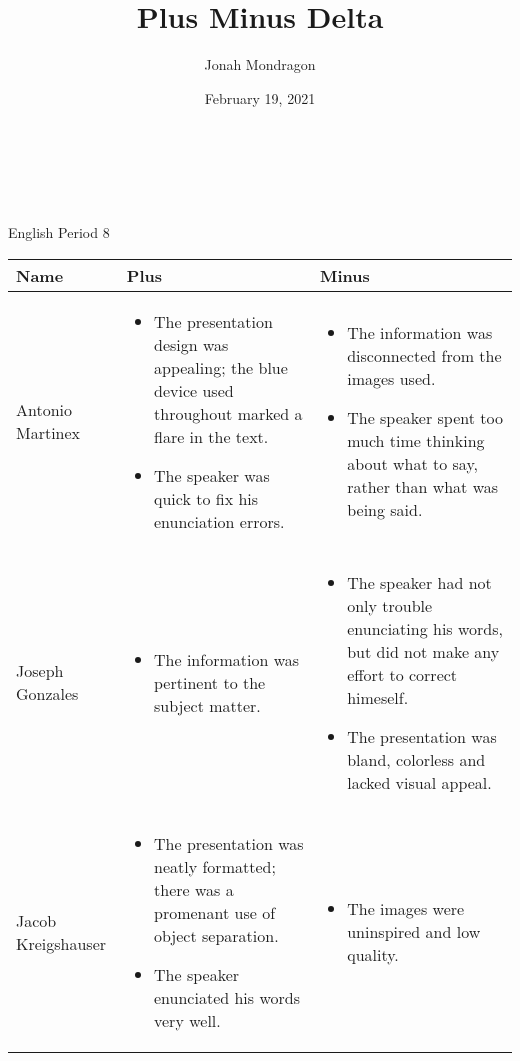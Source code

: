 \documentclass{article}
\renewcommand{\maketitle}
{
    \begin{center}
        {\huge\bfseries\thetitle \\ [0.5ex]}
        \theauthor \\ [0.5ex]
        \thedate \\  [0.5ex]
        English Period 8
        \vspace{1ex}
        \hline
    \end{center}
}
\begin{document}
\title{Plus Minus Delta}
\author{Jonah Mondragon}
\date{February 19, 2021}

\maketitle

\begin{center}
    \begin{longtable}[c]{|m{1.9in}|m{1.9in}|m{1.9in}|}
        \hline
        Name & Plus & Minus \\
        \hline\hline
        Antonio Martinex
        &
        \begin{itemize}
            \item{The presentation design was appealing; the blue device used throughout marked a flare in the text.}
            \item{The speaker was quick to fix his enunciation errors.}
        \end{itemize}
        &
        \begin{itemize}
            \item{The information was disconnected from the images used.}
            \item{The speaker spent too much time thinking about what to say, rather than what was being said.}
        \end{itemize}
        \\
        \hline

        Joseph Gonzales
        &
        \begin{itemize}
            \item{The information was pertinent to the subject matter.}
        \end{itemize}
        &
        \begin{itemize}
            \item{The speaker had not only trouble enunciating his words, but did not make any effort to correct himeself.}
            \item{The presentation was bland, colorless and lacked visual appeal.}
        \end{itemize}
        \\
        \hline

        Jacob Kreigshauser
        &
        \begin{itemize}
            \item{The presentation was neatly formatted; there was a promenant use of object separation.}
            \item{The speaker enunciated his words very well.}
        \end{itemize}
        &
        \begin{itemize}
            \item{The images were uninspired and low quality.}
        \end{itemize}
        \\
        \hline


\end{longtable}
\end{center}
\end{document}
